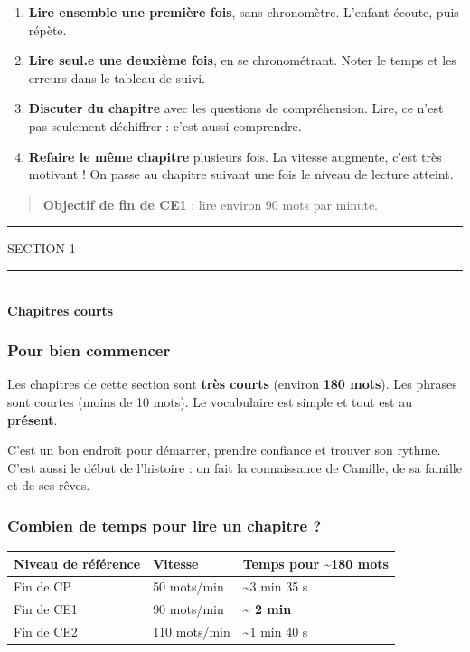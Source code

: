 \documentclass[
  french,
  french,
  14pt,
  a4paper]{extarticle}
\newcounter{none} %
\providecommand{\tightlist}{%
  \setlength{\itemsep}{0pt}\setlength{\parskip}{0pt}}
\newcommand{\sectiondivider}[2]{%
  \vspace*{2cm}%
  \begin{center}
    {\fontsize{18pt}{22pt}\selectfont\textcolor{accentcolor}{\MakeUppercase{Section #1}}}\\[0.6em]
    \textcolor{accentcolor}{\rule{0.35\textwidth}{1.5pt}}\\[1em]
    {\fontsize{38pt}{44pt}\selectfont\bfseries #2}
  \end{center}
  \vspace{1.5cm}
}
\begin{document}
\begin{enumerate}
\def\labelenumi{\arabic{enumi}.}
\tightlist
\item
  \textbf{Lire ensemble une première fois}, sans chronomètre. L'enfant écoute, puis répète.
\item
  \textbf{Lire seul.e une deuxième fois}, en se chronométrant. Noter le temps et les erreurs dans le tableau de suivi.
\item
  \textbf{Discuter du chapitre} avec les questions de compréhension. Lire, ce n'est pas seulement déchiffrer : c'est aussi comprendre.
\item
  \textbf{Refaire le même chapitre} plusieurs fois. La vitesse augmente, c'est très motivant ! On passe au chapitre suivant une fois le niveau de lecture atteint.
\end{enumerate}

\begin{quote}
\textbf{Objectif de fin de CE1} : lire environ 90 mots par minute.
\end{quote}

\begin{center}\rule{0.5\linewidth}{0.5pt}\end{center}

\newpage

\sectiondivider{1}{Chapitres courts}

\subsubsection{Pour bien commencer}\label{pour-bien-commencer}

Les chapitres de cette section sont \textbf{très courts} (environ
\textbf{180 mots}). Les phrases sont courtes (moins de 10 mots). Le
vocabulaire est simple et tout est au \textbf{présent}.

C'est un bon endroit pour démarrer, prendre confiance et trouver son
rythme. C'est aussi le début de l'histoire : on fait la connaissance de
Camille, de sa famille et de ses rêves.

\subsubsection{Combien de temps pour lire un chapitre
?}\label{combien-de-temps-pour-lire-un-chapitre}

{\def\LTcaptype{none} %
\begin{longtable}[]{@{}lll@{}}
\toprule\noalign{}
Niveau de référence & Vitesse & Temps pour \textasciitilde180 mots \\
\midrule\noalign{}
\endhead
\bottomrule\noalign{}
\endlastfoot
Fin de CP & 50 mots/min & \textasciitilde3 min 35 s \\
Fin de CE1 & 90 mots/min & \textbf{\textasciitilde{} 2 min} \\
Fin de CE2 & 110 mots/min & \textasciitilde1 min 40 s \\
\end{longtable}
}
\end{document}
